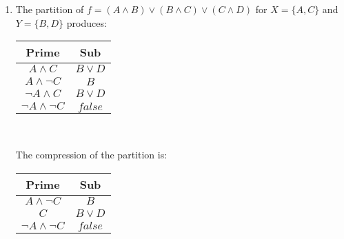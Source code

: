 \documentclass{article}
\begin{document}
\section{}
\renewcommand{\labelenumi}{(\alph{enumi})}
 \begin{enumerate}
\item The partition of $f = (A \land B)\lor(B \land C)\lor(C \land D)$ for $X = \{A,C\}$ and $Y = \{B, D\}$ produces:
\begin{center}
       \begin{tabular}{ |c|c| }
        \hline
         Prime&Sub \\ 
         \hline
         $A \land C$ & $B \lor D$ \\
         \hline
         $A \land \lnot C$ & $B$ \\
         \hline
         $\lnot A \land C$ & $B \lor D$ \\
         \hline
         $\lnot A \land \lnot C$ & $false$ \\
         \hline
        \end{tabular} \\
\end{center}
The compression of the partition is:
\begin{center}
       \begin{tabular}{ |c|c| }
        \hline
         Prime&Sub \\ 
         \hline
         $A \land \lnot C$ & $B$ \\
         \hline
         $C$ & $B \lor D$ \\
         \hline
         $\lnot A \land \lnot C$ & $false$ \\
         \hline
        \end{tabular} \\
\end{center}
    

\end{enumerate}
\end{document}
